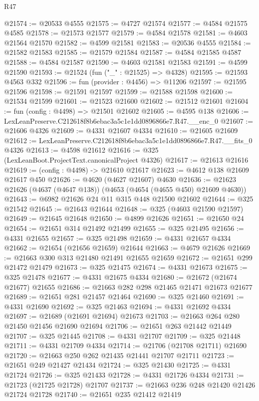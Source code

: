\begin{lexlean}{R47}
\begin{coremodule}
@21574 := @20533 @4555
@21575 := @4727 @21574
@21577 := @4584 @21575 @4585
@21578 := @21573 @21577
@21579 := @4584 @21578
@21581 := @4603 @21564 @21570
@21582 := @4599 @21581
@21583 := @20536 @4555
@21584 := @21582 @21583
@21585 := @21579 @21584
@21587 := @4584 @21585 @4587
@21588 := @4584 @21587
@21590 := @4603 @21581 @21583
@21591 := @4599 @21590
@21593 := @21524 (fun ("_" : @21525) => @4328)
@21595 := @21593 @4563 @332
@21596 := fun (provider : @4456) => @11206
@21597 := @21595 @21596
@21598 := @21591 @21597
@21599 := @21588 @21598
@21600 := @21534 @21599
@21601 := @21523 @21600
@21602 := @21512 @21601
@21604 := fun (config : @4498) => @21501 @21602
@21605 := @4595 @138
@21606 := LexLeanPreserve.C212618f8b6ebac3a5c1e1dd0896866e7.R47.__enc_0
@21607 := @21606 @4326
@21609 := @4331 @21607 @4334
@21610 := @21605 @21609
@21612 := LexLeanPreserve.C212618f8b6ebac3a5c1e1dd0896866e7.R47.__fits_0 @4326
@21613 := @4598 @21612
@21616 := @325 (LexLeanBoot.ProjectText.canonicalProject @4326)
@21617 := @21613 @21616
@21619 := (config : @4498) -> @21610 @21617
@21623 := @4612 @138 @21609 @21617 @450
@21626 := @4620 (@4627 @21607) @4630
@21636 := @21623 @21626 (@4637 (@4647 @138)) (@4653 (@4654 (@4655 @450) @21609 @4630))
@21643 := @6982 @21626 @24 @11 @315 @448 @21500 @21602
@21644 := @325 @21542
@21645 := @21643 @21644
@21648 := @325 (@4603 @21590 @21597)
@21649 := @21645 @21648
@21650 := @4899 @21626
@21651 := @21650 @24
@21654 := @21651 @314 @21492 @21499
@21655 := @325 @21495
@21656 := @4331 @21655
@21657 := @325 @21498
@21659 := @4331 @21657 @4334
@21662 := @21654 (@21656 @21659) @21644
@21663 := @4679 @21626
@21669 := @21663 @300 @313 @21480 @21491 @21655 @21659
@21672 := @21651 @299 @21472 @21479
@21673 := @325 @21475
@21674 := @4331 @21673
@21675 := @325 @21478
@21677 := @4331 @21675 @4334
@21680 := @21672 (@21674 @21677) @21655
@21686 := @21663 @282 @298 @21465 @21471 @21673 @21677
@21689 := @21651 @281 @21457 @21464
@21690 := @325 @21460
@21691 := @4331 @21690
@21692 := @325 @21463
@21694 := @4331 @21692 @4334
@21697 := @21689 (@21691 @21694) @21673
@21703 := @21663 @264 @280 @21450 @21456 @21690 @21694
@21706 := @21651 @263 @21442 @21449
@21707 := @325 @21445
@21708 := @4331 @21707
@21709 := @325 @21448
@21711 := @4331 @21709 @4334
@21714 := @21706 (@21708 @21711) @21690
@21720 := @21663 @250 @262 @21435 @21441 @21707 @21711
@21723 := @21651 @249 @21427 @21434
@21724 := @325 @21430
@21725 := @4331 @21724
@21726 := @325 @21433
@21728 := @4331 @21726 @4334
@21731 := @21723 (@21725 @21728) @21707
@21737 := @21663 @236 @248 @21420 @21426 @21724 @21728
@21740 := @21651 @235 @21412 @21419

\end{coremodule}
\end{lexlean}
